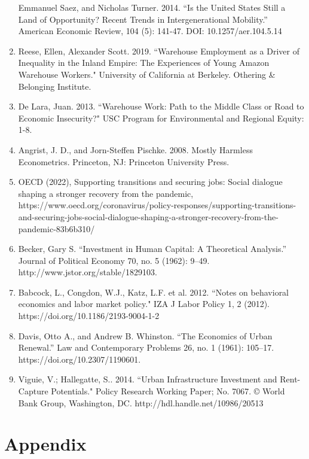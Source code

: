 \documentclass[11pt]{article}
\begin{document}
\begin{center}
\begin{enumerate}
Emmanuel Saez, and Nicholas Turner. 2014. “Is the United States Still a Land of Opportunity? Recent Trends in Intergenerational Mobility.” American Economic Review, 104 (5): 141-47. DOI: 10.1257/aer.104.5.14
 \item Reese, Ellen, Alexander Scott. 2019. “Warehouse Employment as a Driver of Inequality in the Inland Empire: The Experiences of Young Amazon Warehouse Workers." University of California at Berkeley. Othering \& Belonging Institute.
 \item De Lara, Juan. 2013. “Warehouse Work: Path to the Middle Class or Road to Economic Insecurity?" USC Program for Environmental and Regional Equity: 1-8.
\item Angrist, J. D., and Jorn-Steffen Pischke. 2008. Mostly Harmless Econometrics. Princeton, NJ: Princeton University Press.
 \item OECD (2022), Supporting transitions and securing jobs: Social dialogue shaping a stronger recovery from the pandemic, https://www.oecd.org/coronavirus/policy-responses/supporting-transitions-and-securing-jobs-social-dialogue-shaping-a-stronger-recovery-from-the-pandemic-83b6b310/
 \item Becker, Gary S. “Investment in Human Capital: A Theoretical Analysis.” Journal of Political Economy 70, no. 5 (1962): 9–49. http://www.jstor.org/stable/1829103. 
 \item Babcock, L., Congdon, W.J., Katz, L.F. et al. 2012. “Notes on behavioral economics and labor market policy." IZA J Labor Policy 1, 2 (2012). https://doi.org/10.1186/2193-9004-1-2
 \item Davis, Otto A., and Andrew B. Whinston. “The Economics of Urban Renewal.” Law and Contemporary Problems 26, no. 1 (1961): 105–17. https://doi.org/10.2307/1190601.
 \item Viguie, V.; Hallegatte, S.. 2014. “Urban Infrastructure Investment and Rent-Capture Potentials." Policy Research Working Paper; No. 7067. © World Bank Group, Washington, DC. http://hdl.handle.net/10986/20513
\end{enumerate}  
\end{center}

\clearpage

\section{Appendix}
\end{document}
